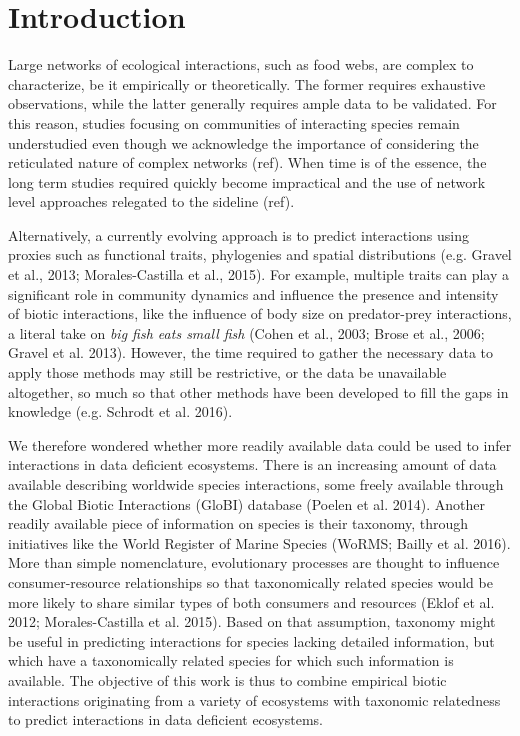 \documentclass[letterpaper]{article}
\begin{document}
\section{Introduction}

Large networks of ecological interactions, such as food webs, are complex to characterize, be it empirically or theoretically. The former requires exhaustive observations, while the latter generally requires ample data to be validated. For this reason, studies focusing on communities of interacting species remain understudied even though we acknowledge the importance of considering the reticulated nature of complex networks (ref). When time is of the essence, the long term studies required quickly become impractical and the use of network level approaches relegated to the sideline (ref).

Alternatively, a currently evolving approach is to predict interactions using proxies such as functional traits, phylogenies and spatial distributions (e.g. Gravel et al., 2013; Morales-Castilla et al., 2015). For example, multiple traits can play a significant role in community dynamics and influence the presence and intensity of biotic interactions, like the influence of body size on predator-prey interactions, a literal take on \textit{big fish eats small fish} (Cohen et al., 2003; Brose et al., 2006; Gravel et al. 2013). However, the time required to gather the necessary data to apply those methods may still be restrictive, or the data be unavailable altogether, so much so that other methods have been developed to fill the gaps in knowledge (e.g. Schrodt et al. 2016).

We therefore wondered whether more readily available data could be used to infer interactions in data deficient ecosystems. There is an increasing amount of data available describing worldwide species interactions, some freely available through the Global Biotic Interactions (GloBI) database (Poelen et al. 2014). Another readily available piece of information on species is their taxonomy, through initiatives like the World Register of Marine Species (WoRMS; Bailly et al. 2016). More than simple nomenclature, evolutionary processes are thought to influence consumer-resource relationships so that taxonomically related species would be more likely to share similar types of both consumers and resources (Eklof et al. 2012; Morales-Castilla et al. 2015). Based on that assumption, taxonomy might be useful in predicting interactions for species lacking detailed information, but which have a taxonomically related species for which such information is available. The objective of this work is thus to combine empirical biotic interactions originating from a variety of ecosystems with taxonomic relatedness to predict interactions in data deficient ecosystems.
\end{document}
